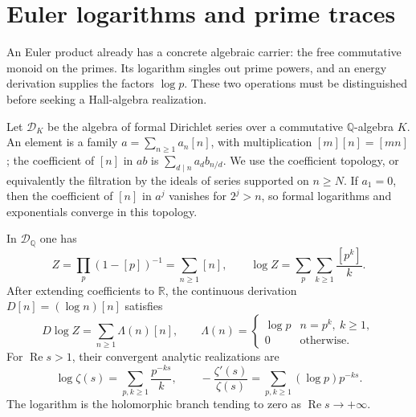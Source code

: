 \section{Euler logarithms and prime traces}
\label{v4-arith:ks:logL-not-cyclic}

An Euler product already has a concrete algebraic carrier: the free
commutative monoid on the primes. Its logarithm singles out prime powers,
and an energy derivation supplies the factors $\log p$. These two
operations must be distinguished before seeking a Hall-algebra realization.

Let $\mathscr D_K$ be the algebra of formal Dirichlet series over a
commutative $\mathbb Q$-algebra $K$. An element is a family
$a=\sum_{n\geq1}a_n[n]$, with multiplication $[m][n]=[mn]$;
the coefficient of $[n]$ in $ab$ is $\sum_{d\mid n}a_db_{n/d}$.
We use the coefficient topology, or equivalently the filtration by the
ideals of series supported on $n\geq N$. If $a_1=0$, then the coefficient
of $[n]$ in $a^j$ vanishes for $2^j>n$, so formal logarithms and
exponentials converge in this topology.

\begin{proposition}
\label{v4-arith:obs:logL-not-cyclic}
\ClaimStatusProvedHere{}
In $\mathscr D_{\mathbb Q}$ one has
\begin{equation}
 Z=\prod_p(1-[p])^{-1}=\sum_{n\geq1}[n],
 \qquad
 \log Z=\sum_p\sum_{k\geq1}\frac{[p^k]}{k}.
 \label{v4-arith:ks:euler-log}
\end{equation}
After extending coefficients to $\mathbb R$, the continuous derivation
$D[n]=(\log n)[n]$ satisfies
\begin{equation}
 D\log Z=\sum_{n\geq1}\Lambda(n)[n],\qquad
 \Lambda(n)=
 \begin{cases}\log p&n=p^k,\ k\geq1,\\0&\text{otherwise.}\end{cases}
 \label{v4-arith:ks:euler-derivation}
\end{equation}
For $\operatorname{Re}s>1$, their convergent analytic realizations are
\begin{equation}
 \log\zeta(s)=\sum_{p,k\geq1}\frac{p^{-ks}}{k},
 \qquad
 -\frac{\zeta'(s)}{\zeta(s)}
   =\sum_{p,k\geq1}(\log p)p^{-ks}.
 \label{v4-arith:ks:euler-analytic}
\end{equation}
The logarithm is the holomorphic branch tending to zero as
$\operatorname{Re}s\longrightarrow+\infty$.
\end{proposition}

